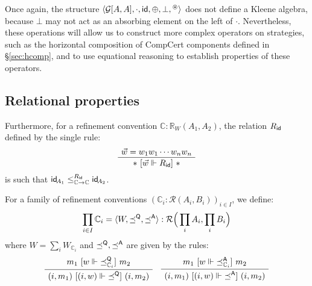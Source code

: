 Once again,
the structure
$\langle \mathcal{G}[A,A], \cdot,  \mathsf{id} , \oplus, \bot, {}^\oast \rangle$
does not define a Kleene algebra,
because $\bot$ may not act as an absorbing element
on the left of $\cdot$.
Nevertheless,
these operations will allow us to construct
more complex operators on strategies,
such as the horizontal composition of CompCert components
defined in \S\ref{sec:hcomp},
and to use equational reasoning to
establish properties of these operators.


\subsection{Relational properties} %

Furthermore,
for a refinement convention
$\mathbb{C} : \mathbb{R}_{W}(A_1, A_2)$,
the relation $R_{ \mathsf{id} }$ defined by the single rule:
\[
    \AxiomC{$\vec{w} = w_1 w_1 \cdots w_n w_n$}
    \UnaryInfC{$* \ifr{\vec{w} \Vdash R_\kw{id}} *$}
    \DisplayProof
\]
is such that
$ \mathsf{id} _{\!A_1} \le_{\mathbb{C} \rightarrow \mathbb{C}}^{R_{ \mathsf{id} }}  \mathsf{id} _{\!A_2}$.

\begin{definition}
For a family of refinement conventions
$(\mathbb{C}_i : \mathcal{R}(A_i, B_i))_{i \in I}$,
we define:
\[ \prod_{i \in I} \mathbb{C}_i =
   \langle W, {\preceq}^{ \mathsf{Q} }, {\preceq}^{ \mathsf{A} } \rangle :
   \mathcal{R}\Big(\prod_i A_i, \prod_i B_i \Big) \]
where
$W = \sum_i W_{\mathbb{C}_i}$ and
$\preceq^{ \mathsf{Q} }, \preceq^{ \mathsf{A} }$
are given by the rules:
\[
    \small
    \AxiomC{$m_1 \ifr{w \Vdash {\preceq}_{\mathbb{C}_i}^\kw{Q}} m_2$}
    \UnaryInfC{$(i, m_1) \ifr{(i, w) \Vdash {\preceq}^\kw{Q}} (i, m_2)$}
    \DisplayProof
    \quad
    \AxiomC{$m_1 \ifr{w \Vdash {\preceq}_{\mathbb{C}_i}^\kw{A}} m_2$}
    \UnaryInfC{$(i, m_1) \ifr{(i, w) \Vdash {\preceq}^\kw{A}} (i, m_2)$}
    \DisplayProof
\]
\end{definition}

